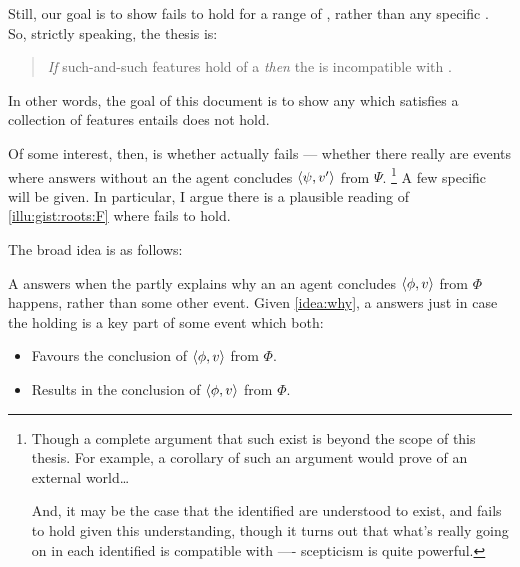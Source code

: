 \begin{note}
  Still, our goal is to show \issueInclusion{} fails to hold for a range of , rather than any specific .
  So, strictly speaking, the thesis is:
  \begin{quote}
    \emph{If} such-and-such features hold of a \scen{} \emph{then} the \scen{} is incompatible with \issueInclusion{}.
  \end{quote}
  In other words, the goal of this document is to show any  which satisfies a collection of features entails \issueInclusion{} does not hold.

  Of some interest, then, is whether \issueInclusion{} actually fails --- whether there really are events where  answers \qWhy{} without an  the agent concludes \(\langle\psi, v'\rangle\) from \(\Psi\).%
  \footnote{
    Though a complete argument that such  exist is beyond the scope of this thesis.
    For example, a corollary of such an argument would prove of an external world\dots

    And, it may be the case that the  identified are understood to exist, and \issueInclusion{} fails to hold given this understanding, though it turns out that what's really going on in each  identified is compatible with \issueInclusion{} ---- scepticism is quite powerful.
  }
  A few specific  will be given.
  In particular, I argue there is a plausible reading of \autoref{illu:gist:roots:F} where \issueInclusion{} fails to hold.
\end{note}


\begin{note}
  The broad idea is as follows:

  A \fingfr{} answers \qWhy{} when the \fingfr{} partly explains why an  an agent concludes \(\langle\phi, v\rangle\) from \(\Phi\) happens, rather than some other event.
  Given \autoref{idea:why}, a \fingfr{} answers \qWhy{} just in case the \fingfr{} holding is a key part of some event which both:
  \begin{itemize}
  \item
    Favours the \agents{} conclusion of \(\langle\phi, v\rangle\) from \(\Phi\).
  \item
    Results in the \agents{} conclusion of \(\langle\phi, v\rangle\) from \(\Phi\).
  \end{itemize}
\end{note}


